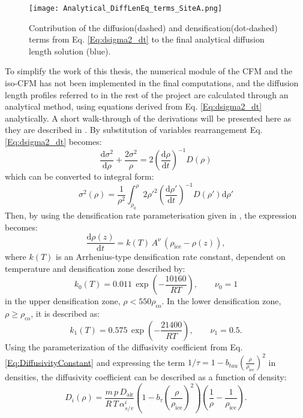 \documentclass[../../CompleteThesis2/Complete_2ndDraft.tex]{subfiles}
\begin{document}
	\begin{figure}
		\centering
		\texttt{[image: Analytical\_DiffLenEq\_terms\_SiteA.png]}
		\caption[Rate terms of the diffusion equation.]{\small Contribution of the diffusion(dashed) and densification(dot-dashed) terms from Eq. \ref{Eq:dsigma2_dt} to the final analytical diffusion length solution (blue).}
		\label{Fig:ICE_DiffDensTerms}
	\end{figure}
	
	To simplify the work of this thesis, the numerical module of the CFM and the iso-CFM has not been implemented in the final computations, and the diffusion length profiles referred to in the rest of the project are calculated through an analytical method, using equations derived from Eq. \ref{Eq:dsigma2_dt} analytically. A short walk-through of the derivations will be presented here as they are described in \cite[Gkinis et al., 2021]{Gkinis2021}.
	By substitution of variables rearrangement Eq. \ref{Eq:dsigma2_dt} becomes:
	\begin{equation}
		\frac{\text{d}\sigma^2}{\text{d}\rho} + \frac{2\sigma^2}{\rho} = 2\left(\frac{\text{d}\rho}{\text{d}t}\right)^{-1}D(\rho)
		\label{Eq:dsigma_dt_rearrange}
	\end{equation}
	which can be converted to integral form:
	\begin{equation}
		\sigma^2(\rho) = \frac{1}{\rho^2}\int_{\rho_0}^{\rho}2\rho'^2\left(\frac{\text{d}\rho'}{\text{d}t}\right)^{-1}D(\rho')\text{d}\rho'
		\label{Eq:sigma2_rho_integral}
	\end{equation}
	Then, by using the densification rate parameterisation given in \cite[Herron and Langway, 1980]{HerronLangway1980}, the expression becomes:
	\begin{equation}
		\frac{\text{d}\rho(z)}{\text{d}t} = k(T)\, A^{\nu}\, (\rho_{\text{ice}} - \rho(z)),
		\label{Eq:drho_dt}
	\end{equation}
	where $k(T)$ is an Arrhenius-type densification rate constant, dependent on temperature and densification zone described by:
	\begin{equation}
		k_0(T) = 0.011\, \exp\left(-\frac{10160}{RT}\right), \qquad \nu_0 = 1
		\label{Eq:ArrCoeff_Zone1}
	\end{equation}
	in the upper densification zone, $\rho < 550 \rho_{\text{co}}$. In the lower densification zone, $\rho \geq \rho_{\text{co}}$, it is described as:
	\begin{equation}
		k_1(T) = 0.575\, \exp\left(-\frac{21400}{RT}\right), \qquad \nu_1 = 0.5.
		\label{Eq:ArrCoeff_Zone2}
	\end{equation}
	Using the parameterization of the diffusivity coefficient from Eq. \ref{Eq:DiffusivityConstant} and expressing the term $1/\tau = 1-b_{tau}\left(\frac{\rho}{\rho_{\text{ice}}}\right)^2$ in densities, the diffusivity coefficient can be described as a function of density:
	\begin{equation}
		D_i(\rho) = \frac{m \, p \, D_{\text{air}}}{R \, T \, \alpha_{s/v}^i}\left(1-b_{\tau}\left(\frac{\rho}{\rho_{\text{ice}}}\right)^2\right)\left(\frac{1}{\rho} - \frac{1}{\rho_{\text{ice}}}\right).
		\label{Eq:DiffusivityConstant_2}
	\end{equation}
	
\end{document}
